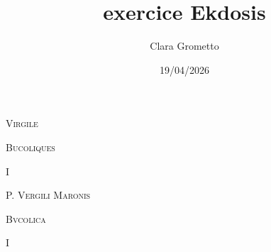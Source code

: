 \documentclass[a4paper,12pt,twoside, titlepage]{book}
\title{exercice Ekdosis}
\author{Clara Grometto}
\date{19/04/2026}
\begin{document}









\begin{center}\huge\textsc{Virgile}\end{center}

\begin{center}\large\textsc{Bucoliques}\end{center}

\begin{center}\large I\end{center}



\begin{center}\huge\textsc{P. Vergili Maronis}\end{center}

\begin{center}\large\textsc{Bvcolica}\end{center}

\begin{center}\large I\end{center}


\end{document}
